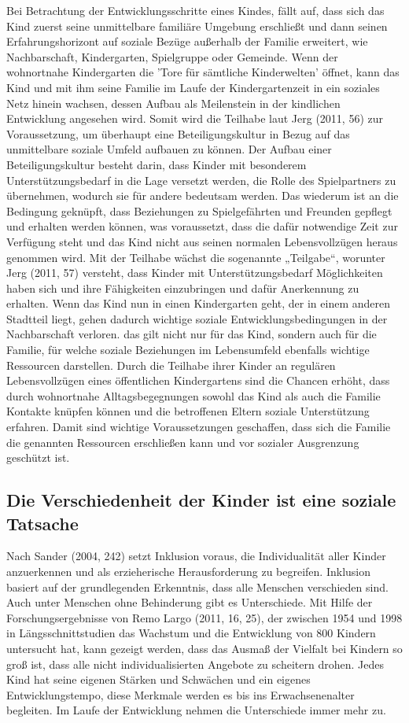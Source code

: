 Bei Betrachtung der Entwicklungsschritte eines Kindes, fällt auf, dass sich das Kind zuerst seine unmittelbare familiäre Umgebung erschließt und dann seinen Erfahrungshorizont auf soziale Bezüge außerhalb der Familie erweitert, wie Nachbarschaft, Kindergarten, Spielgruppe oder Gemeinde. Wenn der wohnortnahe Kindergarten die 'Tore für sämtliche Kinderwelten' öffnet, kann das Kind und mit ihm seine Familie im Laufe der Kindergartenzeit in ein soziales Netz hinein wachsen, dessen Aufbau als Meilenstein in der kindlichen Entwicklung angesehen wird. 
Somit wird die Teilhabe laut Jerg (2011, 56) zur Voraussetzung, um überhaupt eine Beteiligungskultur in Bezug auf das unmittelbare soziale Umfeld aufbauen zu können. Der Aufbau einer Beteiligungskultur besteht darin, dass Kinder mit besonderem Unterstützungsbedarf in die Lage versetzt werden, die Rolle des Spielpartners zu übernehmen, wodurch sie für andere bedeutsam werden. Das wiederum ist an die Bedingung geknüpft, dass Beziehungen zu Spielgefährten und Freunden gepflegt und erhalten werden können, was voraussetzt, dass die dafür notwendige Zeit zur Verfügung steht und das Kind nicht aus seinen normalen Lebensvollzügen heraus genommen wird.
Mit der Teilhabe wächst die sogenannte „Teilgabe“, worunter Jerg (2011, 57) versteht, dass Kinder mit Unterstützungsbedarf Möglichkeiten haben sich und ihre Fähigkeiten einzubringen und dafür Anerkennung zu erhalten. 
Wenn das Kind nun in einen Kindergarten geht, der in einem anderen Stadtteil liegt, gehen dadurch wichtige soziale Entwicklungsbedingungen in der Nachbarschaft verloren. das gilt nicht nur für das Kind, sondern auch für die Familie, für welche soziale Beziehungen im Lebensumfeld ebenfalls wichtige Ressourcen darstellen. Durch die Teilhabe ihrer Kinder an regulären Lebensvollzügen eines öffentlichen Kindergartens sind die Chancen erhöht, dass durch wohnortnahe Alltagsbegegnungen sowohl das Kind als auch die Familie Kontakte knüpfen können und die betroffenen Eltern soziale Unterstützung erfahren. Damit sind wichtige Voraussetzungen geschaffen, dass sich die Familie die genannten Ressourcen erschließen kann und vor sozialer Ausgrenzung geschützt ist. 

\subsection{Die Verschiedenheit der Kinder ist eine soziale Tatsache}\label{sec:heterogenität}
Nach Sander (2004, 242) setzt Inklusion voraus, die Individualität aller Kinder anzuerkennen und als erzieherische Herausforderung zu begreifen. Inklusion basiert auf der grundlegenden Erkenntnis, dass alle Menschen verschieden sind. Auch unter Menschen ohne Behinderung gibt es Unterschiede. Mit Hilfe der Forschungsergebnisse von Remo Largo (2011, 16, 25), der zwischen 1954 und 1998 in Längsschnittstudien das Wachstum und die Entwicklung von 800 Kindern untersucht hat, kann gezeigt werden, dass das Ausmaß der Vielfalt bei Kindern so groß ist, dass alle nicht individualisierten Angebote zu scheitern drohen. Jedes Kind hat seine eigenen Stärken und Schwächen und ein eigenes Entwicklungstempo, diese Merkmale werden es bis ins Erwachsenenalter begleiten. Im Laufe der Entwicklung nehmen die Unterschiede immer mehr zu. 

